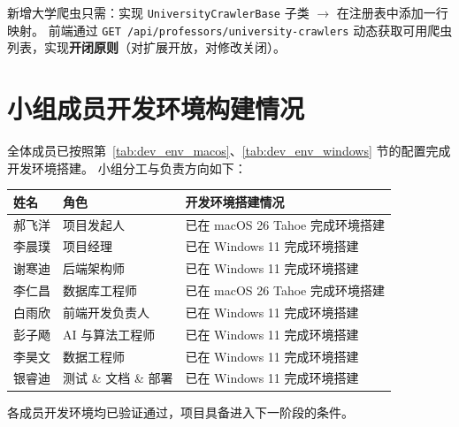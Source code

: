\documentclass[11pt]{article}
\begin{document}
新增大学爬虫只需：实现 \texttt{UniversityCrawlerBase} 子类 $\rightarrow$ 在注册表中添加一行映射。
前端通过 \texttt{GET /api/professors/university-crawlers} 动态获取可用爬虫列表，实现\textbf{开闭原则}（对扩展开放，对修改关闭）。

\section{小组成员开发环境构建情况}

全体成员已按照第~\ref{tab:dev_env_macos}、\ref{tab:dev_env_windows} 节的配置完成开发环境搭建。
小组分工与负责方向如下：

\begin{center}
\begin{tabular}{lll}
\toprule
\textbf{姓名} & \textbf{角色} & \textbf{开发环境搭建情况} \\
\midrule
郝飞洋 & 项目发起人 & 已在 macOS 26 Tahoe 完成环境搭建 \\
李晨璞 & 项目经理 & 已在 Windows 11 完成环境搭建 \\
谢寒迪 & 后端架构师 & 已在 Windows 11 完成环境搭建 \\
李仁昌 & 数据库工程师 & 已在 macOS 26 Tahoe 完成环境搭建 \\
白雨欣 & 前端开发负责人 & 已在 Windows 11 完成环境搭建 \\
彭子飏 & AI 与算法工程师 & 已在 Windows 11 完成环境搭建 \\
李昊文 & 数据工程师 & 已在 Windows 11 完成环境搭建 \\
银睿迪 & 测试 \& 文档 \& 部署 & 已在 Windows 11 完成环境搭建 \\
\bottomrule
\end{tabular}
\end{center}

各成员开发环境均已验证通过，项目具备进入下一阶段的条件。
\end{document}
